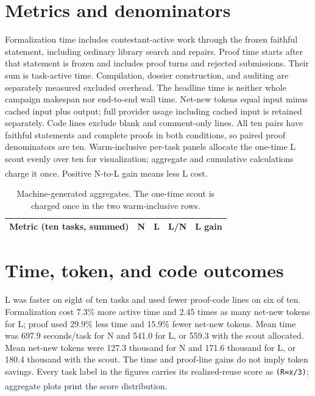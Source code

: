\documentclass[10pt,a4paper]{article}
\newcommand{\src}[1]{\textsuperscript{\cite{#1}}}
\begin{document}
\section{Metrics and denominators}

Formalization time includes contestant-active work through the frozen
faithful statement, including ordinary library search and repairs. Proof
time starts after that statement is frozen and includes proof turns and
rejected submissions. Their sum is task-active time. Compilation, dossier
construction, and auditing are separately measured excluded overhead. The
headline time is neither whole campaign makespan nor end-to-end wall time.
Net-new tokens equal input minus cached input plus output; full provider
usage including cached input is retained separately. Code lines exclude
blank and comment-only lines. All ten pairs have faithful statements and
complete proofs in both conditions, so paired proof denominators are ten.
Warm-inclusive per-task panels allocate the one-time L scout evenly over ten
for visualization; aggregate and cumulative calculations charge it once.
Positive N-to-L gain means less L cost.\src{metrics,taskledger,warmroot}

\begin{table}[ht]\centering\small
\begin{tabular}{@{}lrrrr@{}}\toprule
Metric (ten tasks, summed) & N & L & L/N & L gain\\\midrule

\end{tabular}
\caption{Machine-generated aggregates. The one-time scout is charged once in
the two warm-inclusive rows.\cite{summary,plotcode}}
\label{tab:aggregate}
\end{table}

\section{Time, token, and code outcomes}

L was faster on eight of ten tasks and used fewer proof-code lines on six of
ten. Formalization cost 7.3\% more active time and 2.45 times as many net-new
tokens for L; proof used 29.9\% less time and 15.9\% fewer net-new tokens.
Mean time was 697.9 seconds/task for N and 541.0 for L, or 559.3 with the
scout allocated. Mean net-new tokens were 127.3 thousand for N and 171.6
thousand for L, or 180.4 thousand with the scout. The time and proof-line
gains do not imply token savings. Every task label in the figures carries
its realized-reuse score as \texttt{(R=x/3)}; aggregate plots print the score
distribution.\src{summary,reuse,plotcode}
\end{document}
